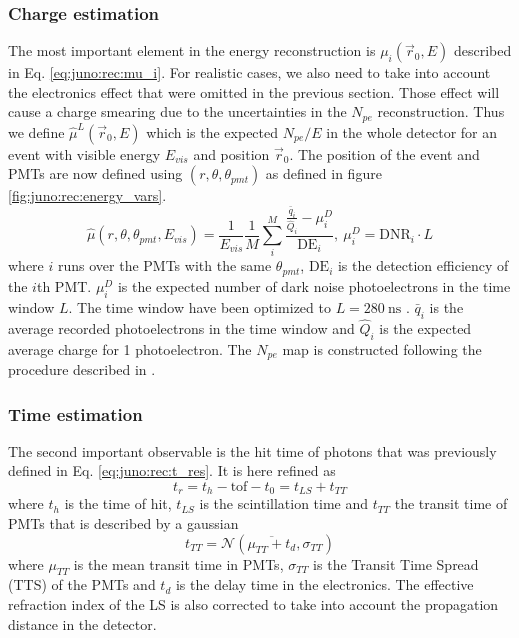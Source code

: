 \subsubsection{Charge estimation}

The most important element in the energy reconstruction is $\mu_i(\vec{r}_0, E)$ described in Eq. \ref{eq:juno:rec:mu_i}. For realistic cases, we also need to take into account the electronics effect that were omitted in the previous section. Those effect will cause a charge smearing due to the uncertainties in the $N_{pe}$ reconstruction. Thus we define $\hat{\mu}^L(\vec{r}_0, E)$ which is the expected $N_{pe}/E$ in the whole detector for an event with visible energy $E_{vis}$ and position $\vec{r}_0$. The position of the event and PMTs are now defined using $(r, \theta, \theta_{pmt})$ as defined in figure \ref{fig:juno:rec:energy_vars}.
\begin{equation}
  \hat{\mu}(r, \theta, \theta_{pmt}, E_{vis}) = \frac{1}{E_{vis}} \frac{1}{M} \sum_i^M\frac{\frac{\bar{q}_i}{\hat{Q}_i} - \mu_i^D}{\mathrm{DE}_i}, ~ \mu_i^D = \mathrm{DNR}_i \cdot L
\end{equation}
where $i$ runs over the PMTs with the same $\theta_{pmt}$, $\mathrm{DE}_i$ is the detection efficiency of the $i$th PMT. $\mu_i^D$ is the expected number of dark noise photoelectrons in the time window $L$. The time window have been optimized to $L = 280 ~ \mathrm{ns}$ \cite{huang_data-driven_2023}. $\bar{q}_i$ is the average recorded photoelectrons in the time window and $\hat{Q}_i$ is the expected average charge for 1 photoelectron. The $N_{pe}$ map is constructed following the procedure described in \cite{huang_improving_2021}.

\subsubsection{Time estimation}

The second important observable is the hit time of photons that was previously defined in Eq. \ref{eq:juno:rec:t_res}. It is here refined as
\begin{equation}
  t_r = t_h - \mathrm{tof} - t_0 = t_{LS} + t_{TT}
\end{equation}
where $t_h$ is the time of hit, $t_{LS}$ is the scintillation time and $t_{TT}$ the transit time of PMTs that is described by a gaussian
\begin{equation}
  t_{TT} = \mathcal{N}(\overline{\mu_{TT} + t_{d}}, \sigma_{TT})
\end{equation}
where $\mu_{TT}$ is the mean transit time in PMTs, $\sigma_{TT}$ is the Transit Time Spread (TTS) of the PMTs and $t_{d}$ is the delay time in the electronics. The effective refraction index of the LS is also corrected to take into account the propagation distance in the detector.

